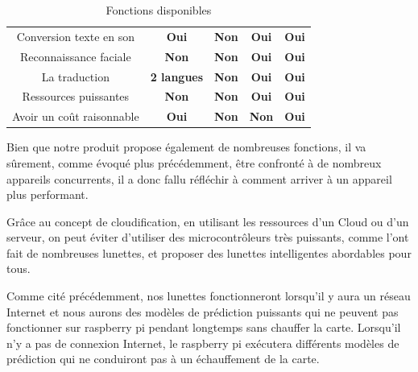 {\begin{table}[h!]
{\begin{adjustbox}{max width=1.1\textwidth,center}
\begin{tabular}{| c | c | c | c | c |}
 
 Conversion texte en son  & \cellcolor[HTML]{73ffa6}\textbf{Oui}&   
 \cellcolor[HTML]{ff7373}\textbf{Non}& \cellcolor[HTML]{73ffa6}\textbf{Oui}&  \cellcolor[HTML]{73ffa6}\textbf{Oui} \\ 
 
 
 Reconnaissance faciale & 
 \cellcolor[HTML]{ff7373}\textbf{Non}&   
 \cellcolor[HTML]{ff7373}\textbf{Non}& \cellcolor[HTML]{73ffa6}\textbf{Oui}&  \cellcolor[HTML]{73ffa6}\textbf{Oui} \\ 
 
 
 La traduction & 
 \cellcolor[HTML]{ff7373}\textbf{2 langues}&   
 \cellcolor[HTML]{ff7373}\textbf{Non}& \cellcolor[HTML]{73ffa6}\textbf{Oui}&  \cellcolor[HTML]{73ffa6}\textbf{Oui} \\
 
 
 Ressources puissantes& 
 \cellcolor[HTML]{ff7373}\textbf{Non}&   
 \cellcolor[HTML]{ff7373}\textbf{Non}& \cellcolor[HTML]{73ffa6}\textbf{Oui}&  \cellcolor[HTML]{73ffa6}\textbf{Oui} \\
 
 
Avoir un coût raisonnable& 
 \cellcolor[HTML]{73ffa6}\textbf{Oui}&   
 \cellcolor[HTML]{ff7373}\textbf{Non}& \cellcolor[HTML]{ff7373}\textbf{Non}&  \cellcolor[HTML]{73ffa6}\textbf{Oui} \\ [1ex]
 
 

 \hline
\end{tabular}
\end{adjustbox}
}
\caption{Fonctions disponibles}
\label{table:1}
\end{table}



Bien que notre produit propose également de nombreuses fonctions, il va sûrement, comme évoqué plus précédemment, être confronté à de nombreux appareils concurrents, il a donc fallu réfléchir à comment arriver à un appareil plus performant.

Grâce au concept de cloudification, en utilisant les ressources d'un Cloud ou d'un serveur, on peut éviter d'utiliser des microcontrôleurs très puissants, comme l'ont fait de nombreuses lunettes, et proposer des lunettes intelligentes abordables pour tous.

Comme cité précédemment, nos lunettes fonctionneront lorsqu'il y aura un réseau Internet et nous aurons des modèles de prédiction puissants qui ne peuvent pas fonctionner sur raspberry pi pendant longtemps sans chauffer la carte. Lorsqu'il n'y a pas de connexion Internet, le raspberry pi exécutera différents modèles de prédiction qui ne conduiront pas à un échauffement de la carte.





}
